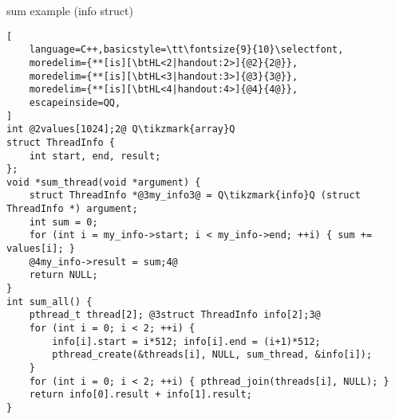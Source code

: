 \begin{frame}[fragile,label=sumToStack]{sum example (info struct)}
\begin{lstlisting}[
    language=C++,basicstyle=\tt\fontsize{9}{10}\selectfont,
    moredelim={**[is][\btHL<2|handout:2>]{@2}{2@}},
    moredelim={**[is][\btHL<3|handout:3>]{@3}{3@}},
    moredelim={**[is][\btHL<4|handout:4>]{@4}{4@}},
    escapeinside=QQ,
]
int @2values[1024];2@ Q\tikzmark{array}Q
struct ThreadInfo {
    int start, end, result;
};
void *sum_thread(void *argument) {
    struct ThreadInfo *@3my_info3@ = Q\tikzmark{info}Q (struct ThreadInfo *) argument;
    int sum = 0;
    for (int i = my_info->start; i < my_info->end; ++i) { sum += values[i]; }
    @4my_info->result = sum;4@
    return NULL;
}
int sum_all() {
    pthread_t thread[2]; @3struct ThreadInfo info[2];3@
    for (int i = 0; i < 2; ++i) {
        info[i].start = i*512; info[i].end = (i+1)*512;
        pthread_create(&threads[i], NULL, sum_thread, &info[i]);
    }
    for (int i = 0; i < 2; ++i) { pthread_join(threads[i], NULL); }
    return info[0].result + info[1].result;
}
\end{lstlisting}
\end{frame}
